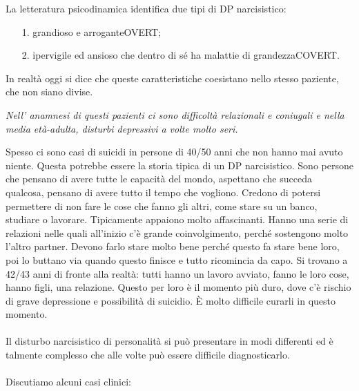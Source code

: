 La letteratura psicodinamica identifica due tipi di DP narcisistico:

\begin{itemize}
\item[1.] grandioso e arroganteOVERT;
\item[2.] ipervigile ed ansioso che dentro di sé ha malattie di grandezzaCOVERT.
\end{itemize}

In realtà oggi si dice che queste caratteristiche coesistano nello
stesso paziente, che non siano divise.

\emph{\emph{Nell' anamnesi di questi pazienti ci sono difficoltà
relazionali e coniugali e nella media età-adulta, disturbi depressivi a
volte molto seri. }}

Spesso ci sono casi di suicidi in persone di 40/50 anni che non hanno
mai avuto niente. Questa potrebbe essere la storia tipica di un DP
narcisistico. Sono persone che pensano di avere tutte le capacità del
mondo, aspettano che succeda qualcosa, pensano di avere tutto il tempo
che vogliono. Credono di potersi permettere di non fare le cose che
fanno gli altri, come stare su un banco, studiare o lavorare.
Tipicamente appaiono molto affascinanti. Hanno una serie di relazioni
nelle quali all'inizio c'è grande coinvolgimento, perché sostengono
molto l'altro partner. Devono farlo stare molto bene perché questo fa
stare bene loro, poi lo buttano via quando questo finisce e tutto
ricomincia da capo. Si trovano a 42/43 anni di fronte alla realtà: tutti
hanno un lavoro avviato, fanno le loro cose, hanno figli, una relazione.
Questo per loro è il momento più duro, dove c'è rischio di grave
depressione e possibilità di suicidio. È molto difficile curarli in
questo momento.
\\\\
Il disturbo narcisistico di personalità si può presentare in modi
differenti ed è talmente complesso che alle volte può essere difficile
diagnosticarlo.
\\\\
Discutiamo alcuni casi clinici:


